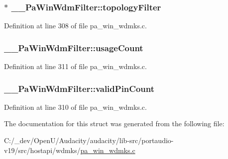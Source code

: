 \subsubsection[{\texorpdfstring{topology\+Filter}{topologyFilter}}]{$\ast$ \+\_\+\+\_\+\+Pa\+Win\+Wdm\+Filter\+::topology\+Filter}\hypertarget{struct_____pa_win_wdm_filter_aa0e3f96e187199b62f9c5bfd500cf3e7}{}\label{struct_____pa_win_wdm_filter_aa0e3f96e187199b62f9c5bfd500cf3e7}


Definition at line 308 of file pa\+\_\+win\+\_\+wdmks.\+c.

\subsubsection[{\texorpdfstring{usage\+Count}{usageCount}}]{ \+\_\+\+\_\+\+Pa\+Win\+Wdm\+Filter\+::usage\+Count}\hypertarget{struct_____pa_win_wdm_filter_a044b9a83d9af60246e4f1696182ef1b8}{}\label{struct_____pa_win_wdm_filter_a044b9a83d9af60246e4f1696182ef1b8}


Definition at line 311 of file pa\+\_\+win\+\_\+wdmks.\+c.

\subsubsection[{\texorpdfstring{valid\+Pin\+Count}{validPinCount}}]{ \+\_\+\+\_\+\+Pa\+Win\+Wdm\+Filter\+::valid\+Pin\+Count}\hypertarget{struct_____pa_win_wdm_filter_a5c441f64352697c820c2b296979e984b}{}\label{struct_____pa_win_wdm_filter_a5c441f64352697c820c2b296979e984b}


Definition at line 310 of file pa\+\_\+win\+\_\+wdmks.\+c.



The documentation for this struct was generated from the following file\+:\begin{DoxyCompactItemize}
\item 
C\+:/\+\_\+dev/\+Open\+U/\+Audacity/audacity/lib-\/src/portaudio-\/v19/src/hostapi/wdmks/\hyperlink{pa__win__wdmks_8c}{pa\+\_\+win\+\_\+wdmks.\+c}\end{DoxyCompactItemize}
